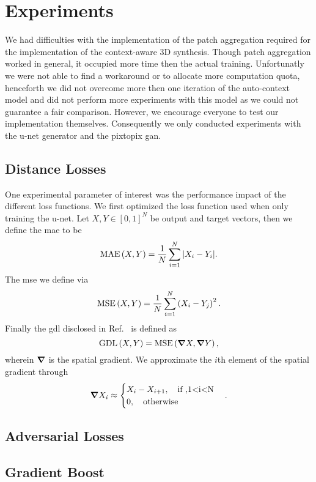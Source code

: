 \section{Experiments}

We had difficulties with the implementation of the patch aggregation required
for the implementation of the context-aware 3D synthesis. Though patch
aggregation worked in general, it occupied more time then the actual training.
Unfortunatly we were not able to find a workaround or to allocate more
computation quota, henceforth we did not overcome more then one iteration of
the auto-context model and did not perform more experiments with this model
as we could not guarantee a fair comparison. However, we encourage everyone
to test our implementation themselves. Consequently we only conducted
experiments with the u-net generator and the pixtopix \gls{gan}.

\subsection{Distance Losses}

One experimental parameter of interest was the performance impact of the
different loss functions. We first optimized the loss function used when
only training the u-net. Let $X,Y\in[0,1]^N$ be output and target vectors,
then we define the \gls{mae} to be
\begin{equation}
  \operatorname{MAE}\left(X,Y\right)
  =
  \frac{1}{N}\sum_{i=1}^N
  \abs{X_i-Y_i}
  \label{eq:mae}.
\end{equation}
The \gls{mse} we define via
\begin{equation}
  \operatorname{MSE}\left(X,Y\right)
  =
  \frac{1}{N}\sum_{i=1}^N
  \left(X_i-Y_j\right)^2
  \label{eq:mse}.
\end{equation}
Finally the \gls{gdl} disclosed in Ref.~\cite{Nie16} is defined as
\begin{equation}
  \operatorname{GDL}\left(X,Y\right)
  =
  \operatorname{MSE}\left(\grad X,\grad Y\right)
  \label{eq:gdl},
\end{equation}
wherein $\grad$ is the spatial gradient. We approximate the $i$th element
of the spatial gradient through
\begin{equation}
  \grad X_i
  \approx
  \begin{cases}
    X_i-X_{i+1}\qc\text{if }, $1<i<N$\\
    0\qc\text{otherwise}
  \end{cases}
  \label{eq:grad}.
\end{equation}

\subsection{Adversarial Losses}


\subsection{Gradient Boost}


